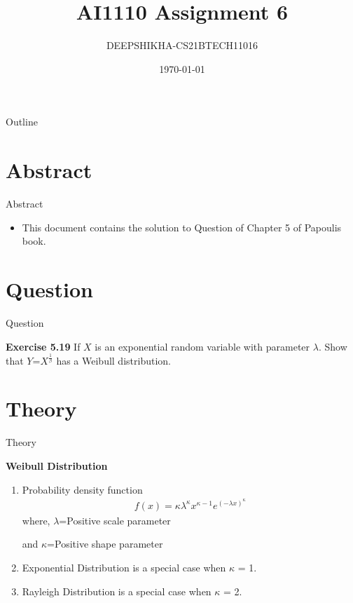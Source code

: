 \documentclass{beamer}
\title{AI1110 Assignment 6}
\author{DEEPSHIKHA-CS21BTECH11016}
\date{\today}
\begin{document}
\begin{frame}
		\titlepage
	\end{frame}

\begin{frame}{Outline}
  \tableofcontents
\end{frame}
\section{Abstract}
\begin{frame}{Abstract}
\begin{itemize}
\item 	This document contains the solution to Question of Chapter 5 of Papoulis book.
\end{itemize}
\end{frame}
	
\section{Question}
\begin{frame}{Question}
\begin{block}{\textbf{ Exercise 5.19}}
If $X$ is an exponential random variable with parameter $\lambda$. Show that $Y$=$X^{\frac{1}{\beta}}$ has a Weibull distribution. 
\end{block}
\end{frame}
	
\section{Theory}
\begin{frame}{Theory}
\begin{block}{\textbf{Weibull Distribution}}
\begin{enumerate}
    \item Probability density function
    \begin{align}
        f(x)=\kappa \lambda^{\kappa} x^{\kappa-1} e^{{(-\lambda x)}^{\kappa}}
    \end{align}
  where, $\lambda$=Positive scale parameter 
  
     and  $\kappa$=Positive shape parameter
     \item Exponential Distribution is a special case when $\kappa$ = 1.
     \item Rayleigh Distribution is a special case when $\kappa$ = 2.
\end{enumerate}

\end{block}

\end{frame}
	
\end{document}
